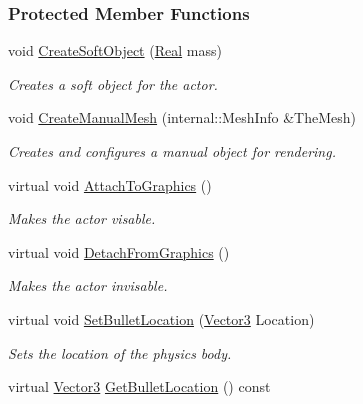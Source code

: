 \subsubsection*{Protected Member Functions}
\begin{DoxyCompactItemize}
\item 
void \hyperlink{classphys_1_1ActorSoft_acc0ff92e2dcc0e5d99ca62f07bc9174d}{CreateSoftObject} (\hyperlink{namespacephys_af7eb897198d265b8e868f45240230d5f}{Real} mass)
\begin{DoxyCompactList}\small\item\em Creates a soft object for the actor. \item\end{DoxyCompactList}\item 
void \hyperlink{classphys_1_1ActorSoft_a341d9124acd59a4597745c3eff06dfc8}{CreateManualMesh} (internal::MeshInfo \&TheMesh)
\begin{DoxyCompactList}\small\item\em Creates and configures a manual object for rendering. \item\end{DoxyCompactList}\item 
virtual void \hyperlink{classphys_1_1ActorSoft_a37b3bf631e8f73b3f19c3bb043d011c3}{AttachToGraphics} ()
\begin{DoxyCompactList}\small\item\em Makes the actor visable. \item\end{DoxyCompactList}\item 
virtual void \hyperlink{classphys_1_1ActorSoft_a568b070c746775b73a3aa8ab33d6cc58}{DetachFromGraphics} ()
\begin{DoxyCompactList}\small\item\em Makes the actor invisable. \item\end{DoxyCompactList}\item 
virtual void \hyperlink{classphys_1_1ActorSoft_aef041f3eee69bb8eceef32fa0513e340}{SetBulletLocation} (\hyperlink{classphys_1_1Vector3}{Vector3} Location)
\begin{DoxyCompactList}\small\item\em Sets the location of the physics body. \item\end{DoxyCompactList}\item 
virtual \hyperlink{classphys_1_1Vector3}{Vector3} \hyperlink{classphys_1_1ActorSoft_a2b30f96cb01df382a774dfae5200fed0}{GetBulletLocation} () const 

\end{DoxyCompactItemize}
